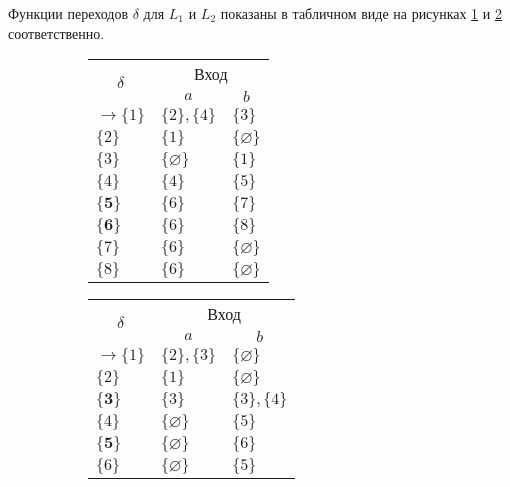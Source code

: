 Функции переходов $\delta$ для $L_1$ и $L_2$ показаны в табличном виде на рисунках \ref{app-ex-task3-1} и \ref{app-ex-task3-2} соответственно.

\begin{figure}
\centering
\begin{subfigure}[b]{.4\linewidth}
\centering
		\begin{tabular}{lll}
			\toprule
			\multicolumn{1}{c}{\multirow{2}{*}{\Large $\delta$}}
			& \multicolumn{2}{c}{Вход} \\
			\cmidrule(rl){2-3}
			& \multicolumn{1}{c}{$a$}
			& \multicolumn{1}{c}{$b$}  \\
			\midrule
			$\to \{1\}$       & $\{2\}, \{4\}$      		 & $\{3\}$      \\
			$\{2\}$       & $\{1\}$    			 & $\{\varnothing\}$      \\
			$\{3\}$       & $\{\varnothing\}$    			 & $\{1\}$       \\
			$\{4\}$       & $\{4\}$    			 & $\{5\}$       \\
			$\{\textbf{5}\}$       & $\{6\}$    			 & $\{7\}$       \\
			$\{\textbf{6}\}$       & $\{6\}$    			 & $\{8\}$     \\
			$\{7\}$       & $\{6\}$    			 & $\{\varnothing\}$     \\
			$\{8\}$       & $\{6\}$    	 & $\{\varnothing\}$  \\
			\bottomrule
		\end{tabular}
\caption{}\label{app-ex-task3-1}
\end{subfigure}%
%
\begin{subfigure}[b]{.4\linewidth}
\centering
		\begin{tabular}{lll}
			\toprule
			\multicolumn{1}{c}{\multirow{2}{*}{\Large $\delta$}}
			& \multicolumn{2}{c}{Вход} \\
			\cmidrule(rl){2-3}
			& \multicolumn{1}{c}{$a$}
			& \multicolumn{1}{c}{$b$}  \\
			\midrule
			$\to \{1\}$       & $\{2\}, \{3\}$      		 & $\{\varnothing\}$      \\
			$\{2\}$       & $\{1\}$    			 & $\{\varnothing\}$      \\
			$\{\textbf{3}\}$       & $\{3\}$    			 & $\{3\}, \{4\}$       \\
			$\{4\}$       & $\{\varnothing\}$    			 & $\{5\}$       \\
			$\{\textbf{5}\}$       & $\{\varnothing\}$    			 & $\{6\}$       \\
			$\{6\}$       & $\{\varnothing\}$    			 & $\{5\}$     \\
			\bottomrule
		\end{tabular}
\caption{}\label{app-ex-task3-2}
\end{subfigure}
\caption{}\label{app-ex-task3-3}
\end{figure}
	
